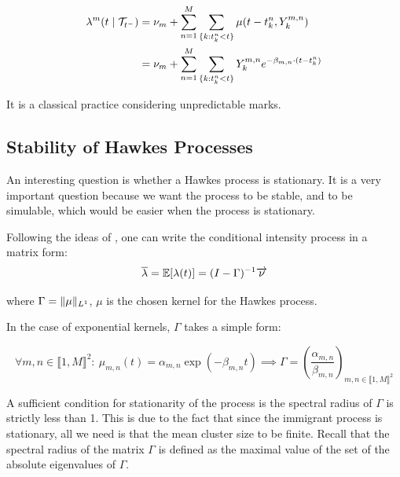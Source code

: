 \documentclass[11pt]{book}
\begin{document}
\begin{align}
\lambda^m (t \mid \mathcal{T}_{t^-} ) &= \nu_m + \sum_{n = 1}^M \sum_{ \{k: t_k^n < t \}} \mu(t- t_k^{n}, Y_k^{m,n}) \notag \\
&=  \nu_m + \sum_{n = 1}^M \sum_{ \{k: t_k^n < t \}}   Y_k^{m,n} e^{- \beta_{m,n} \cdot ( t - t_k^n ) } 
\end{align}

It is a classical practice considering unpredictable marks. 



\subsection{Stability of Hawkes Processes}



An interesting question is whether a Hawkes process is stationary. It is a very important question because we want the process to be stable, and to be simulable, which would be easier when the process is stationary.

Following the ideas of \cite{Hawkes}, one can write the conditional intensity process in a matrix form:
\begin{equation}
\overline{\lambda} = \mathbb E [ \lambda(t) ] = (I - \Gamma) ^{-1}\overrightarrow{\nu}  
\end{equation}

where $ \Gamma = \lVert \mu\rVert_{L^1} $,  $\mu$ is the chosen kernel for the Hawkes process.
 
In the case of exponential kernels, $\Gamma$ takes a simple form:

\begin{equation}
\forall m,n \in \llbracket 1, M \rrbracket^2: \  \mu_{m,n} (t) = \alpha_{m,n} \exp ( - \beta_{m,n} t ) \implies \Gamma = \left ( \frac{ \alpha_{m,n} } { \beta_{m,n} } \right )_{ m,n \in \llbracket 1, M \rrbracket^2} 
\end{equation}

A sufficient condition for stationarity of the process is the spectral radius of $\Gamma$ is strictly less than 1. This is due to the fact that since the immigrant process is stationary, all we need is that the mean cluster size to be finite. Recall that the spectral radius of the matrix $\Gamma$ is defined as the maximal value of the set of the absolute eigenvalues of $\Gamma$.
\end{document}

